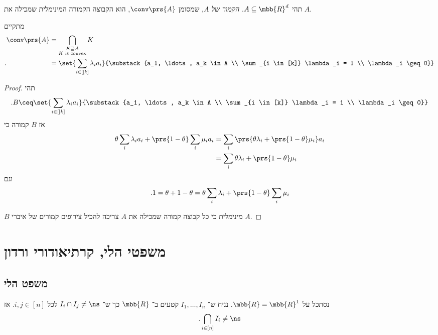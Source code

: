\documentclass[a4paper,10pt,twoside,openany]{book}
\begin{document}
\begin{definition}
תהי
$A \subseteq \mbb{R}^d$.
\emph{הקמור של $A$},
שמסומן
$\conv\prs{A}$,
הוא הקבוצה הקמורה המינימלית שמכילה את
$A$.
\end{definition}

\begin{proposition}
מתקיים
\begin{align*}
\conv\prs{A} &= \bigcap_{\substack{K \supseteq A \\ \text{$K$ is convex}}} K
\\ \text{.} \hphantom{\conv\prs{A}} &= \set{\sum_{i \in [[k]} \lambda_i a_i}{\substack{a_1, \ldots, a_k \in A \\ \sum_{i \in [k]} \lambda_i = 1 \\ \lambda_i \geq 0}}
\end{align*}
\end{proposition}

\begin{proof}
תהי
\[\text{.} B \ceq \set{\sum_{i \in [[k]} \lambda_i a_i}{\substack{a_1, \ldots, a_k \in A \\ \sum_{i \in [k]} \lambda_i = 1 \\ \lambda_i \geq 0}}\]
אז
$B$
קמורה כי
\begin{align*}
\theta \sum_i \lambda_i a_i + \prs{1-\theta} \sum_i \mu_i a_i &= \sum_i \prs{\theta \lambda_i + \prs{1-\theta} \mu_i} a_i \\&=
\sum_i \theta \lambda_i + \prs{1-\theta} \mu_i
\end{align*}
וגם
\[\text{.} 1 = \theta + 1 - \theta = \theta \sum_i \lambda_i + \prs{1-\theta} \sum_i \mu_i\]

$B$
מינימלית כי כל קבוצה קמורה שמכילה את
$A$
צריכה להכיל צירופים קמורים של איברי
$A$.
\end{proof}

\section{משפטי הלי, קרתיאודורי ורדון}

\subsection{משפט הלי}

\begin{theorem}[הלי]
נסתכל על
$\mbb{R} = \mbb{R}^1$.
נניח ש־%
$I_1, \ldots, I_n$
קטעים ב־%
$\mbb{R}$
כך ש־%
$I_i \cap I_j \neq \ns$
לכל
$i,j \in [n]$.
אז
\[\text{.} \bigcap_{i \in [n]} I_i \neq \ns\]
\end{theorem}
\end{document}
